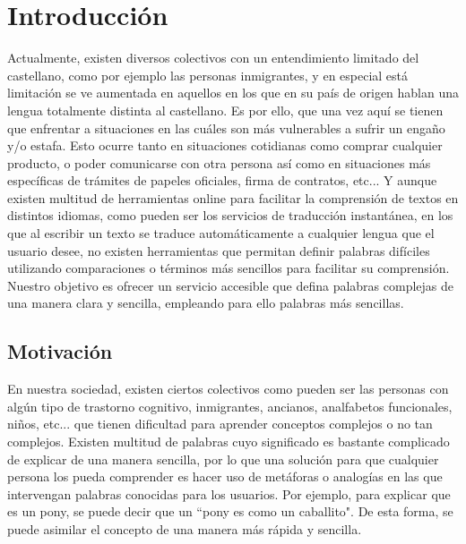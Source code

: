 \chapter{Introducción}
\label{cap:introduccion}

Actualmente, existen diversos colectivos con un entendimiento limitado del castellano, como por ejemplo las personas inmigrantes, y en especial está limitación se ve aumentada en aquellos en los que en su país de origen hablan una lengua totalmente distinta al castellano. Es por ello, que una vez aquí se tienen que enfrentar a situaciones en las cuáles son más vulnerables a sufrir un engaño y/o estafa. Esto ocurre tanto en situaciones cotidianas como comprar cualquier producto, o poder comunicarse con otra persona así como en situaciones más específicas de trámites de papeles oficiales, firma de contratos, etc... Y aunque existen multitud de herramientas online para facilitar la comprensión de textos en distintos idiomas, como pueden ser los servicios de traducción instantánea, en los que al escribir un texto se traduce automáticamente a cualquier lengua que el usuario desee, no existen herramientas que permitan definir palabras difíciles utilizando comparaciones o términos más sencillos para facilitar su comprensión. 
Nuestro objetivo es ofrecer un servicio accesible que defina palabras complejas de una manera clara y sencilla, empleando para ello palabras más sencillas.
 

	


\section{Motivación}
\label{cap:sec:motivacion}

En nuestra sociedad, existen ciertos colectivos como pueden ser las personas con algún tipo de trastorno cognitivo, inmigrantes, ancianos, analfabetos funcionales, niños, etc... que tienen dificultad para aprender conceptos complejos o no tan complejos. 
Existen multitud de palabras cuyo significado es bastante complicado de explicar de una manera sencilla, por lo que una solución para que cualquier persona los pueda comprender es hacer uso de metáforas o analogías en las que intervengan palabras conocidas para los usuarios. Por ejemplo, para explicar que es un pony, se puede decir que un ``pony es como un caballito". De esta forma, se puede asimilar el concepto de una manera más rápida y sencilla.

